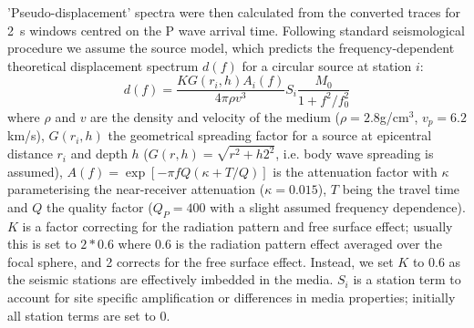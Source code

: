 \documentclass[reviewcopy]{elsart}
\begin{document}
'Pseudo-displacement' spectra were then calculated from the converted traces for 2~s windows
centred on the P wave arrival time.  Following standard seismological
procedure we assume the \citep{brune70} source model, which predicts
the frequency-dependent theoretical displacement spectrum $d(f)$ for a circular source at
station $i$:
\begin{equation}
d(f)=\frac{K G(r_i,h) A_i(f)}{4 \pi \rho v^3} S_i \frac{M_0}{1+f^2/f_0^2} 
\end{equation}
where $\rho$ and $v$ are the density and velocity of the medium
($\rho=2.8$g/cm$^3$, $v_p=6.2$km/s), $G(r_i,h)$ the geometrical 
spreading factor for a source at epicentral distance $r_i$ and depth
$h$ ($G(r,h)=\sqrt{r^2+h2^2}$, i.e. body wave spreading is assumed),
$A(f)=\exp[-\pi f Q (\kappa + T / Q)]$ is the attenuation factor with 
$\kappa$ parameterising the near-receiver attenuation ($\kappa=0.015$),
$T$ being the travel time and $Q$ the quality factor ($Q_P=400$ with a
slight assumed frequency dependence). $K$ is a factor correcting for the
radiation pattern and free surface effect; usually this is set to
$2*0.6$ where 0.6 is the radiation pattern effect averaged over the
focal sphere, and 2 corrects for the free surface effect.  Instead, we
set $K$ to 0.6 as the seismic stations are effectively imbedded in the
media. $S_i$ is a station term to account for site specific
amplification or differences in media properties; initially all
station terms are set to 0. 
\end{document}

